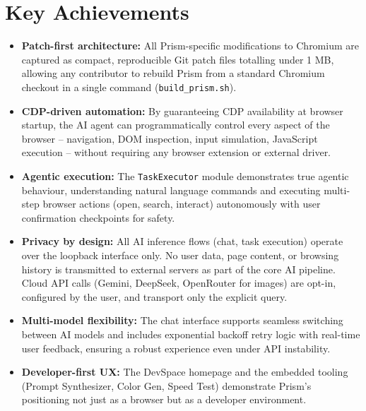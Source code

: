 \section{Key Achievements}
\begin{itemize}[leftmargin=*]
    \item \textbf{Patch-first architecture:} All Prism-specific modifications to Chromium are captured as compact, reproducible Git patch files totalling under 1 MB, allowing any contributor to rebuild Prism from a standard Chromium checkout in a single command (\texttt{build\_prism.sh}).
    \item \textbf{CDP-driven automation:} By guaranteeing CDP availability at browser startup, the AI agent can programmatically control every aspect of the browser -- navigation, DOM inspection, input simulation, JavaScript execution -- without requiring any browser extension or external driver.
    \item \textbf{Agentic execution:} The \texttt{TaskExecutor} module demonstrates true agentic behaviour, understanding natural language commands and executing multi-step browser actions (open, search, interact) autonomously with user confirmation checkpoints for safety.
    \item \textbf{Privacy by design:} All AI inference flows (chat, task execution) operate over the loopback interface only. No user data, page content, or browsing history is transmitted to external servers as part of the core AI pipeline. Cloud API calls (Gemini, DeepSeek, OpenRouter for images) are opt-in, configured by the user, and transport only the explicit query.
    \item \textbf{Multi-model flexibility:} The chat interface supports seamless switching between AI models and includes exponential backoff retry logic with real-time user feedback, ensuring a robust experience even under API instability.
    \item \textbf{Developer-first UX:} The DevSpace homepage and the embedded tooling (Prompt Synthesizer, Color Gen, Speed Test) demonstrate Prism's positioning not just as a browser but as a developer environment.
\end{itemize}

